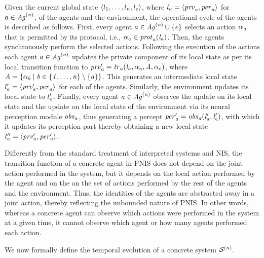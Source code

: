 Given the current global state $\left \langle l_{1}, \ldots, l_{n}, l_{e} \right \rangle$, where $l_{a} = \left \langle \it{prv}_{a}, \it{per}_{a} \right \rangle$ for $a \in \it{Ag}^{(n)}$, of the
agents and the environment, the operational cycle of the agents is described as
follows. First, every agent ${a} \in \it{Ag}^{(n)} \cup \left \{ {e} \right \}$ selects an
action $\it{\alpha}_{a}$ that is permitted by its protocol, i.e., $\it{\alpha}_{a} \in \it{prot}_{a}(l_{a})$. Then, the agents synchronously perform the selected actions.
Following  the execution of the actions each agent ${a} \in \it{Ag}^{(n)}$ updates
the private component of its local state as per its local transition function to
$\it{prv}'_{a} = \it{tr}_{a}( l_{a}, \it{\alpha}_{a}, A, \it{\alpha}_{e})$, where
$A = \left \{  \it{\alpha}_{b} \mid b \in \left \{ 1, \ldots, n \right \} \setminus \left \{ a \right \} \right \}$.  This
generates an intermediate local state $l'_{a} = \left \langle \it{prv}'_{a}, \it{per}_{a} \right \rangle$
for each of the agents. Similarly, the environment updates its local state to
$l'_{e}$. Finally, every agent ${a} \in \it{Ag}^{(n)}$ observes the update on
its local state and the update on the local state of the environment via its
neural perception module $\it{obs}_{a}$, thus generating a percept
$\it{per}'_{a} = \it{obs}_{a}(l'_{a}, l'_{e})$, with which it updates its
perception part thereby obtaining a new local state
$l''_{a} = \left \langle  \it{prv}'_{a}, \it{per}'_{a} \right \rangle$.


Differently from the standard treatment of interpreted systems and NIS, the
transition function of a concrete agent in PNIS  does not depend on the joint
action performed in the system, but it depends on the local action performed by
the  agent and on the on the set of actions performed by the rest of the agents
and the environment.  Thus, the identities of the agents are abstracted away in
a joint action, thereby reflecting the unbounded nature of PNIS. In other words,
whereas  a concrete agent can observe which actions were performed in the system
at a given time,  it cannot observe which agent or how many agents performed
each action.

We now formally define the temporal evolution of a concrete system
$\mathcal{S}^{(n)}$.



